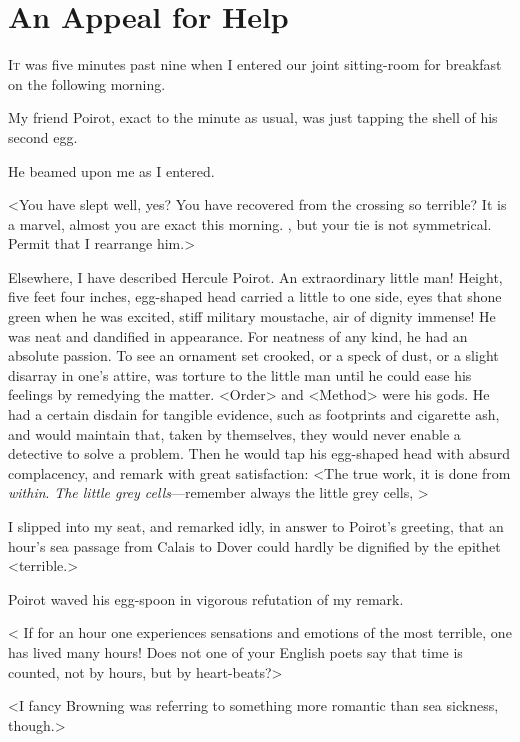 \chapter{An Appeal for Help}

\lettrine{I}{t} was five minutes past nine when I entered our joint sitting-room for breakfast on the following morning. 

\zz
 My friend Poirot, exact to the minute as usual, was just tapping the shell of his second egg. 

 He beamed upon me as I entered. 

 <You have slept well, yes? You have recovered from the crossing so terrible? It is a marvel, almost you are exact this morning. , but your tie is not symmetrical. Permit that I rearrange him.> 

 Elsewhere, I have described Hercule Poirot. An extraordinary little man! Height, five feet four inches, egg-shaped head carried a little to one side, eyes that shone green when he was excited, stiff military moustache, air of dignity immense! He was neat and dandified in appearance. For neatness of any kind, he had an absolute passion. To see an ornament set crooked, or a speck of dust, or a slight disarray in one's attire, was torture to the little man until he could ease his feelings by remedying the matter. <Order> and <Method> were his gods. He had a certain disdain for tangible evidence, such as footprints and cigarette ash, and would maintain that, taken by themselves, they would never enable a detective to solve a problem. Then he would tap his egg-shaped head with absurd complacency, and remark with great satisfaction: <The true work, it is done from \emph{within}. \emph{The little grey cells}—remember always the little grey cells, > 

 I slipped into my seat, and remarked idly, in answer to Poirot's greeting, that an hour's sea passage from Calais to Dover could hardly be dignified by the epithet <terrible.> 

 Poirot waved his egg-spoon in vigorous refutation of my remark. 

 < If for an hour one experiences sensations and emotions of the most terrible, one has lived many hours! Does not one of your English poets say that time is counted, not by hours, but by heart-beats?> 

 <I fancy Browning was referring to something more romantic than sea sickness, though.> 

